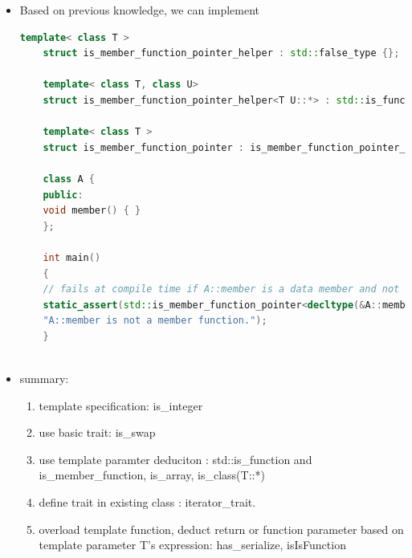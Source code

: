 \documentclass[a4paper,12pt,twoside]{book}
\begin{document}
\begin{itemize}
\begin{lstlisting}[frame=single, language=c++]
	\end{lstlisting}
	
	\item Based on previous knowledge, we can implement 
	\begin{lstlisting}[frame=single, language=c++]
	template< class T >
	struct is_member_function_pointer_helper : std::false_type {};
	
	template< class T, class U>
	struct is_member_function_pointer_helper<T U::*> : std::is_function<T> {};
	
	template< class T >
	struct is_member_function_pointer : is_member_function_pointer_helper< std::remove_cv_t<T> > {};
	
	class A {
	public:
	void member() { }
	};
	
	int main()
	{
	// fails at compile time if A::member is a data member and not a function
	static_assert(std::is_member_function_pointer<decltype(&A::member)>::value,
	"A::member is not a member function."); 
	}
	
	\end{lstlisting}
	
	\item summary:
	\begin{enumerate}
		\item template specification: is\_integer
		\item use basic trait: is\_swap
		\item use template paramter deduciton : std::is\_function and
		is\_member\_function, is\_array, is\_class(T::*)
		\item define trait in existing class : iterator\_trait.
		\item overload template function, deduct return or function parameter based on template parameter T's expression:  has\_serialize, isIsFunction
	\end{enumerate}
	
\end{itemize}
\end{document}
